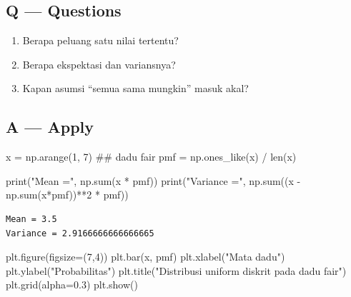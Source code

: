 \documentclass[
  letterpaper,
  DIV=11,
  numbers=noendperiod]{scrreprt}
\newenvironment{Shaded}{\begin{snugshade}}{\end{snugshade}}
\newcommand{\BuiltInTok}[1]{\textcolor[rgb]{0.00,0.23,0.31}{#1}}
\newcommand{\CommentTok}[1]{\textcolor[rgb]{0.37,0.37,0.37}{#1}}
\newcommand{\DecValTok}[1]{\textcolor[rgb]{0.68,0.00,0.00}{#1}}
\newcommand{\FloatTok}[1]{\textcolor[rgb]{0.68,0.00,0.00}{#1}}
\newcommand{\NormalTok}[1]{\textcolor[rgb]{0.00,0.23,0.31}{#1}}
\newcommand{\OperatorTok}[1]{\textcolor[rgb]{0.37,0.37,0.37}{#1}}
\newcommand{\StringTok}[1]{\textcolor[rgb]{0.13,0.47,0.30}{#1}}
\providecommand{\tightlist}{%
  \setlength{\itemsep}{0pt}\setlength{\parskip}{0pt}}
\begin{document}
\subsection{Q --- Questions}\label{q-questions-11}

\begin{enumerate}
\def\labelenumi{\arabic{enumi}.}
\tightlist
\item
  Berapa peluang satu nilai tertentu?
\item
  Berapa ekspektasi dan variansnya?
\item
  Kapan asumsi ``semua sama mungkin'' masuk akal?
\end{enumerate}

\subsection{A --- Apply}\label{a-apply-11}

\begin{Shaded}
\begin{Highlighting}[]
\NormalTok{x }\OperatorTok{=}\NormalTok{ np.arange(}\DecValTok{1}\NormalTok{, }\DecValTok{7}\NormalTok{)  }\CommentTok{\#\# dadu fair}
\NormalTok{pmf }\OperatorTok{=}\NormalTok{ np.ones\_like(x) }\OperatorTok{/} \BuiltInTok{len}\NormalTok{(x)}

\BuiltInTok{print}\NormalTok{(}\StringTok{"Mean ="}\NormalTok{, np.}\BuiltInTok{sum}\NormalTok{(x }\OperatorTok{*}\NormalTok{ pmf))}
\BuiltInTok{print}\NormalTok{(}\StringTok{"Variance ="}\NormalTok{, np.}\BuiltInTok{sum}\NormalTok{((x }\OperatorTok{{-}}\NormalTok{ np.}\BuiltInTok{sum}\NormalTok{(x}\OperatorTok{*}\NormalTok{pmf))}\OperatorTok{**}\DecValTok{2} \OperatorTok{*}\NormalTok{ pmf))}
\end{Highlighting}
\end{Shaded}

\begin{verbatim}
Mean = 3.5
Variance = 2.9166666666666665
\end{verbatim}

\begin{Shaded}
\begin{Highlighting}[]
\NormalTok{plt.figure(figsize}\OperatorTok{=}\NormalTok{(}\DecValTok{7}\NormalTok{,}\DecValTok{4}\NormalTok{))}
\NormalTok{plt.bar(x, pmf)}
\NormalTok{plt.xlabel(}\StringTok{"Mata dadu"}\NormalTok{)}
\NormalTok{plt.ylabel(}\StringTok{"Probabilitas"}\NormalTok{)}
\NormalTok{plt.title(}\StringTok{"Distribusi uniform diskrit pada dadu fair"}\NormalTok{)}
\NormalTok{plt.grid(alpha}\OperatorTok{=}\FloatTok{0.3}\NormalTok{)}
\NormalTok{plt.show()}
\end{Highlighting}
\end{Shaded}
\end{document}

